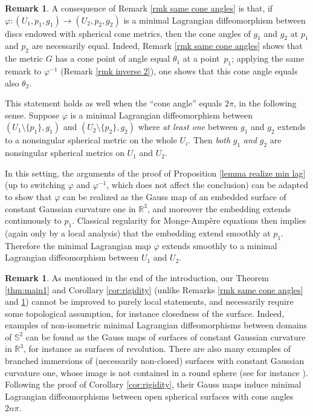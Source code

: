 \documentclass[JEP,XML,SOM,Unicode,NoEqCountersInSection,published]{cedram}
\theoremstyle{definition}
\newtheorem{remark}[cor]{Remark}
\newcommand{\R}{{\mathbb R}}
\begin{document}
\begin{remark}\label{rmk extend}
A consequence of Remark \ref{rmk same cone angles} is that, if $\varphi:(U_1,p_1,g_1)\to (U_2,p_2,g_2)$ is a minimal Lagrangian diffeomorphism between discs endowed with spherical cone metrics, then the cone angles of $g_1$ and $g_2$ at $p_1$ and $p_2$ are necessarily equal. Indeed, Remark \ref{rmk same cone angles} shows that the metric $G$ has a cone point of angle equal $\theta_1$ at a point~$p_1$; applying the same remark to $\varphi^{-1}$ (Remark \ref{rmk inverse 2}), one shows that this cone angle equals also $\theta_2$.

This statement holds as well when the ``cone angle'' equals $2\pi$, in the following sense. Suppose $\varphi$ is a minimal Lagrangian diffeomorphism between $(U_1\setminus\{p_1\},g_1)$ and $(U_2\setminus\{p_2\},g_2)$ where \emph{at least one} between $g_1$ and $g_2$ extends to a nonsingular spherical metric on the whole $U_i$. Then \emph{both} $g_1$ \emph{and} $g_2$ are nonsingular spherical metrics on $U_1$ and $U_2$.

In this setting, the arguments of the proof of Proposition \ref{lemma realize min lag} (up to switching $\varphi$ and $\varphi^{-1}$, which does not affect the conclusion) can be adapted to show that $\varphi$ can be realized as the Gauss map of an embedded surface of constant Gaussian curvature one in $\R^3$, and moreover the embedding extends continuously to $p_1$. Classical regularity for Monge-Ampère equations then implies (again only by a local analysis) that the embedding extend smoothly at $p_1$. Therefore the minimal Lagrangian map $\varphi$ extends smoothly to a minimal Lagrangian diffeomorphism between $U_1$ and $U_2$.
\end{remark}

\begin{remark}
As mentioned in the end of the introduction, our Theorem \ref{thm:main1} and Corollary \ref{cor:rigidity} (unlike Remarks \ref{rmk same cone angles} and \ref{rmk extend}) cannot be improved to purely local statements, and necessarily require some topological assumption, for instance closedness of the surface. Indeed, examples of non-isometric minimal Lagrangian diffeomorphisms between domains of $\mathbb S^2$ can be found as the Gauss maps of surfaces of constant Gaussian curvature in $\R^3$, for instance as surfaces of revolution. There are also many examples of branched immersions of (necessarily non-closed) surfaces with constant Gaussian curvature one, whose image is not contained in a round sphere (see for instance \cite{zbMATH06599450}). Following the proof of Corollary \ref{cor:rigidity}, their Gauss maps induce minimal Lagrangian diffeomorphisms between open spherical surfaces with cone angles~$2n\pi$.
\end{remark}
\end{document}

